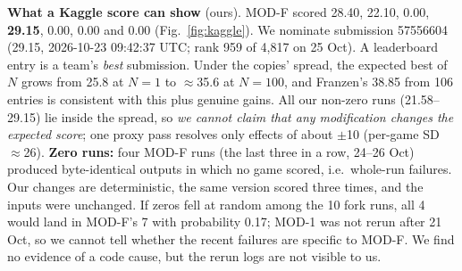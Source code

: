 \documentclass[10pt]{article}
\begin{document}
\textbf{What a Kaggle score can show} (ours). MOD-F scored 28.40, 22.10, 0.00, \textbf{29.15}, 0.00, 0.00 and 0.00 (Fig.~\ref{fig:kaggle}). We nominate submission 57556604 (29.15, 2026-10-23 09:42:37 UTC; rank 959 of 4{,}817 on 25 Oct). A leaderboard entry is a team's \emph{best} submission. Under the copies' spread, the expected best of $N$ grows from 25.8 at $N{=}1$ to $\approx$35.6 at $N{=}100$, and Franzen's 38.85 from 106 entries is consistent with this plus genuine gains. All our non-zero runs (21.58--29.15) lie inside the spread, so \emph{we cannot claim that any modification changes the expected score}; one proxy pass resolves only effects of about $\pm$10 (per-game SD $\approx$26). \textbf{Zero runs:} four MOD-F runs (the last three in a row, 24--26 Oct) produced byte-identical outputs in which no game scored, i.e.\ whole-run failures. Our changes are deterministic, the same version scored three times, and the inputs were unchanged. If zeros fell at random among the 10 fork runs, all 4 would land in MOD-F's 7 with probability 0.17; MOD-1 was not rerun after 21 Oct, so we cannot tell whether the recent failures are specific to MOD-F. We find no evidence of a code cause, but the rerun logs are not visible to us.
\end{document}

